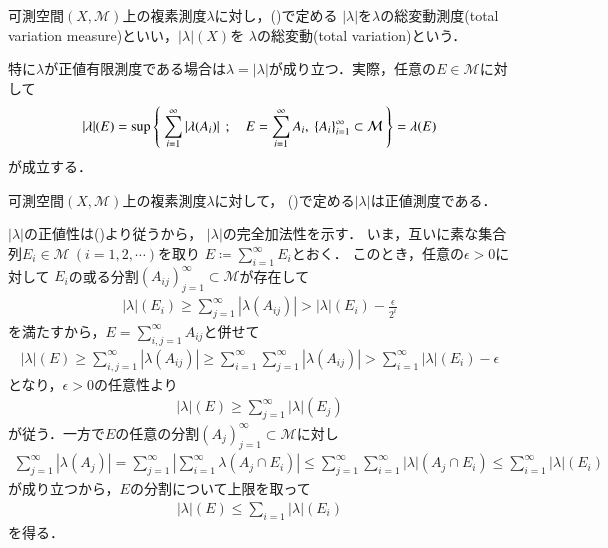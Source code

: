 	\begin{screen}
		\begin{dfn}
			可測空間$(X,\mathcal{M})$上の複素測度$\lambda$に対し，()で定める
			$|\lambda|$を$\lambda$の総変動測度(total variation measure)といい，$|\lambda|(X)$を
			$\lambda$の総変動(total variation)という．
		\end{dfn}
	\end{screen}
	特に$\lambda$が正値有限測度である場合は$\lambda = |\lambda|$が成り立つ．実際，任意の$E \in \mathcal{M}$に対して
	\begin{align}
		|\lambda|(E) = \operatorname*{sup}_{} \left\{\ \sum_{i=1}^{\infty} |\lambda(A_i)|\ \, ; \quad E = \sum_{i=1}^\infty A_i,\ \{A_i\}_{i=1}^\infty \subset \mathcal{M}\ \right\}
		= \lambda(E)
	\end{align}
	が成立する．

	\begin{screen}
		\begin{thm}
			可測空間$(X,\mathcal{M})$上の複素測度$\lambda$に対して，
			()で定める$|\lambda|$は正値測度である．
			\label{thm:total_variation_measure}
		\end{thm}
	\end{screen}
	
	\begin{prf}
		$|\lambda|$の正値性は()より従うから，
		$|\lambda|$の完全加法性を示す．
		いま，互いに素な集合列$E_i \in \mathcal{M}\ (i=1,2,\cdots)$を取り
		$E \coloneqq \sum_{i=1}^{\infty} E_i$とおく．
		このとき，任意の$\epsilon > 0$に対して
		$E_i$の或る分割$(A_{ij})_{j=1}^{\infty} \subset \mathcal{M}$が存在して
		\begin{align}
			|\lambda|(E_i) \geq \sum_{j=1}^{\infty} |\lambda(A_{ij})| 
			> |\lambda|(E_i) - \frac{\epsilon}{2^i}
		\end{align}
		を満たすから，$E = \sum_{i,j=1}^{\infty} A_{ij}$と併せて
		\begin{align}
			|\lambda|(E) \geq \sum_{i,j=1}^{\infty} |\lambda(A_{ij})| \geq \sum_{i=1}^{\infty}\sum_{j=1}^{\infty} |\lambda(A_{ij})| > \sum_{i=1}^{\infty} |\lambda|(E_i) - \epsilon
		\end{align}
		となり，$\epsilon > 0$の任意性より
		\begin{align}
			|\lambda|(E) \geq \sum_{j=1}^{\infty} |\lambda|(E_j)
		\end{align}
		が従う．一方で$E$の任意の分割$(A_j)_{j=1}^{\infty} \subset \mathcal{M}$に対し
		\begin{align}
			\sum_{j=1}^{\infty} |\lambda(A_j)| 
			= \sum_{j=1}^{\infty} \left| \sum_{i=1}^{\infty} \lambda(A_j \cap E_i) \right|
			\leq \sum_{j=1}^{\infty} \sum_{i=1}^{\infty} |\lambda|(A_j \cap E_i)
			\leq \sum_{i=1}^{\infty} |\lambda|(E_i)
		\end{align}
		が成り立つから，$E$の分割について上限を取って
		\begin{align}
			|\lambda|(E) \leq \sum_{i=1} |\lambda|(E_i)
		\end{align}
		を得る．
		\QED
	\end{prf}
	

